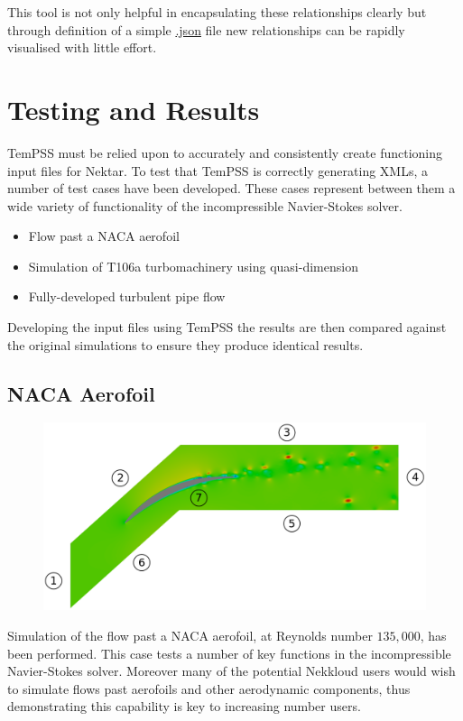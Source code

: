 \documentclass[11pt, a4paper]{report}
\begin{document}
This tool is not only helpful in encapsulating these relationships clearly but through definition of a simple \url{.json} file new relationships can be rapidly visualised with little effort.
\newpage
\chapter{Testing and Results}
TemPSS must be relied upon to accurately and consistently create functioning input files for Nektar. To test that TemPSS is correctly generating XMLs, a number of test cases have been developed. These cases represent between them a wide variety of functionality of the incompressible Navier-Stokes solver.

\begin{itemize}
\item Flow past a NACA aerofoil
\item Simulation of T106a turbomachinery using quasi-dimension
\item Fully-developed turbulent pipe flow
\end{itemize}

Developing the input files using TemPSS the results are then compared against the original simulations to ensure they produce identical results.

\section{NACA Aerofoil}
\begin{figure}[htb!]
 \centering
 \includegraphics[width=.75\linewidth,  clip=true, trim = 0cm 0cm 0cm 0cm]{naca_domain}
 \label{fig:naca_domain}
\end{figure}

Simulation of the flow past a NACA aerofoil, at Reynolds number $135,000$, has been performed. This case tests a number of key functions in the incompressible Navier-Stokes solver. Moreover many of the potential Nekkloud users would wish to simulate flows past aerofoils and other aerodynamic components, thus demonstrating this capability is key to increasing number users.
\end{document}
